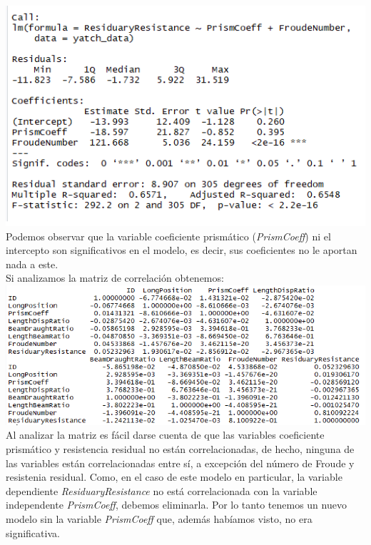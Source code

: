 \documentclass[twoside]{article}
\begin{document}
\begin{multicols}{2}
\includegraphics[scale = 0.5]{images/pic_01.png} \\

Podemos observar que la variable coeficiente prism\'atico (\textit{PrismCoeff}) ni el intercepto son significativos en el modelo, es decir, sus coeficientes no le aportan nada a este. \\
Si analizamos la matriz de correlaci\'on obtenemos: \\

\includegraphics[scale = 0.4]{images/pic_02.png} \\

Al analizar la matriz es f\'acil darse cuenta de que las variables coeficiente prism\'atico y resistencia residual no est\'an correlacionadas, de hecho, ninguna de las variables est\'an correlacionadas entre s\'i, a excepci\'on del n\'umero de Froude y resistenia residual. Como, en el caso de este modelo en particular, la variable dependiente \textit{ResiduaryResistance} no est\'a correlacionada con la variable independente \textit{PrismCoeff}, debemos eliminarla. Por lo tanto tenemos un nuevo modelo sin la variable \textit{PrismCoeff} que, adem\'as hab\'iamos visto, no era significativa.\\


\end{multicols}
\end{document}
